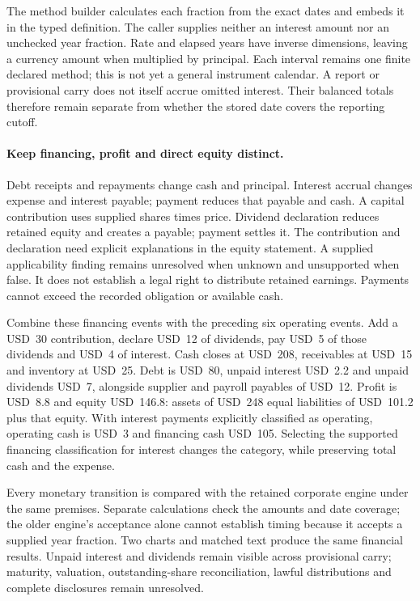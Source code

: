 The method builder calculates each fraction from the exact dates and embeds it
in the typed definition. The caller supplies neither an interest amount nor an
unchecked year fraction. Rate and elapsed years have inverse dimensions, leaving
a currency amount when multiplied by principal. Each interval remains one finite
declared method; this is not yet a general instrument calendar. A report or
provisional carry does not itself accrue omitted interest. Their balanced totals
therefore remain separate from whether the stored date covers the reporting cutoff.

\paragraph{Keep financing, profit and direct equity distinct.}
Debt receipts and repayments change cash and principal. Interest accrual changes
expense and interest payable; payment reduces that payable and cash. A capital
contribution uses supplied shares times price. Dividend declaration reduces
retained equity and creates a payable; payment settles it. The contribution and
declaration need explicit explanations in the equity statement. A supplied
applicability finding remains unresolved when unknown and unsupported when false.
It does not establish a legal right to distribute retained earnings. Payments
cannot exceed the recorded obligation or available cash.

Combine these financing events with the preceding six operating events. Add a
USD~30 contribution, declare USD~12 of dividends, pay USD~5 of those dividends
and USD~4 of interest. Cash closes at USD~208, receivables at USD~15 and inventory
at USD~25. Debt is USD~80, unpaid interest USD~2.2 and unpaid dividends USD~7,
alongside supplier and payroll payables of USD~12. Profit is USD~8.8 and equity
USD~146.8: assets of USD~248 equal liabilities of USD~101.2 plus that equity.
With interest payments explicitly classified as operating, operating cash is
USD~3 and financing cash USD~105. Selecting the supported financing classification
for interest changes the category, while preserving total cash and the expense.

Every monetary transition is compared with the retained corporate engine under
the same premises. Separate calculations check the amounts and date coverage;
the older engine's acceptance alone cannot establish timing because it accepts a
supplied year fraction. Two charts and matched text produce the same financial
results. Unpaid interest and dividends remain visible across provisional carry;
maturity, valuation, outstanding-share reconciliation, lawful distributions and
complete disclosures remain unresolved.

